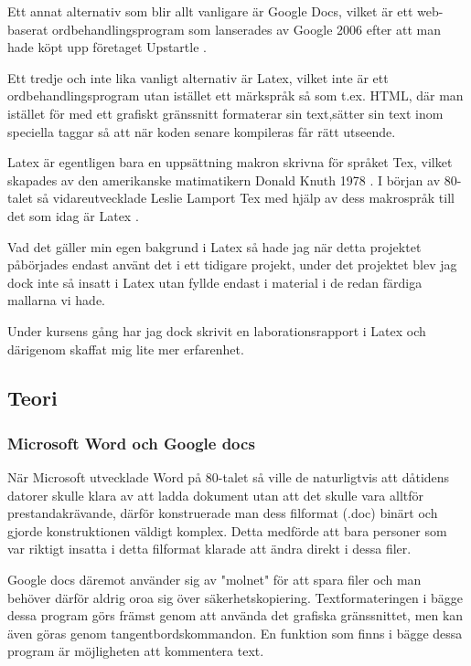 Ett annat alternativ som blir allt vanligare är Google Docs, vilket är ett web-baserat ordbehandlingsprogram som lanserades av Google 2006 \cite{docs_launch} efter att man hade köpt upp företaget Upstartle \cite{upstartle}.

Ett tredje och inte lika vanligt alternativ är Latex, vilket inte är ett ordbehandlingsprogram utan istället ett märkspråk så som t.ex. HTML, där man istället för med ett grafiskt gränssnitt formaterar sin text,sätter sin text inom speciella taggar så att när koden senare kompileras får rätt utseende.

Latex är egentligen bara en uppsättning makron skrivna för språket Tex, vilket skapades av den amerikanske matimatikern Donald Knuth 1978 \cite{donald_knuth}. I början av 80-talet så vidareutvecklade Leslie Lamport Tex med hjälp av dess makrospråk till det som 
idag är Latex \cite{leslie_lamport}.

Vad det gäller min egen bakgrund i Latex så hade jag när detta projektet påbörjades endast använt det i ett tidigare projekt, under det projektet blev jag dock inte så insatt i Latex utan fyllde endast i material i de redan färdiga mallarna vi hade.

Under kursens gång har jag dock skrivit en laborationsrapport i Latex och därigenom skaffat mig lite mer erfarenhet.


\subsection{Teori}
\subsubsection{Microsoft Word och Google docs}
När Microsoft utvecklade Word på 80-talet så ville de naturligtvis att dåtidens datorer skulle klara av att ladda dokument utan att det skulle vara alltför prestandakrävande, därför konstruerade man dess filformat (.doc) binärt och gjorde konstruktionen väldigt komplex. Detta medförde att bara personer som var riktigt insatta i detta filformat klarade att ändra direkt i dessa filer.

Google docs däremot använder sig av "molnet" för att spara filer och man behöver därför aldrig oroa sig över säkerhetskopiering. Textformateringen i bägge dessa program görs främst genom att använda det grafiska gränssnittet, men kan även göras genom tangentbordskommandon. En funktion som finns i bägge dessa program är möjligheten att kommentera text.

